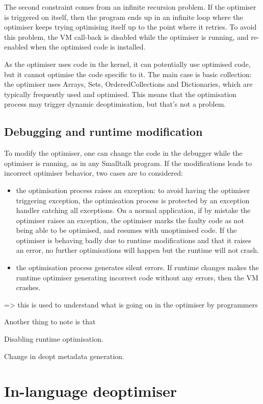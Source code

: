 \documentclass[a4paper,12pt,twoside]{../includes/ThesisStyle}
\begin{document}
The second constraint comes from an infinite recursion problem. If the optimiser is triggered on itself, then the program ends up in an infinite loop where the optimiser keeps trying optimising itself up to the point where it retries. To avoid this problem, the VM call-back is disabled while the optimiser is running, and re-enabled when the optimised code is installed.

As the optimiser uses code in the kernel, it can potentially use optimised code, but it cannot optimise the code specific to it. The main case is basic collection: the optimiser uses Arrays, Sets, OrderedCollections and Dictionaries, which are typically frequently used and optimised. This means that the optimisation process may trigger dynamic deoptimisation, but that's not a problem. 

\subsection{Debugging and runtime modification}

To modify the optimiser, one can change the code in the debugger while the optimiser is running, as in any Smalltalk program. If the modifications leads to incorrect optimiser behavior, two cases are to considered:
\begin{itemize}
	\item the optimisation process raises an exception: to avoid having the optimiser triggering exception, the optimisation process is protected by an exception handler catching all exceptions. On a normal application, if by mistake the optimiser raises an exception, the optimiser marks the faulty code as not being able to be optimised, and resumes with unoptimised code. If the optimiser is behaving badly due to runtime modifications and that it raises an error, no further optimisations will happen but the runtime will not crash.
	\item the optimisation process generates silent errors. If runtime changes makes the runtime optimiser generating incorrect code without any errors, then the VM crashes.
\end{itemize}

=> this is used to understand what is going on in the optimiser by programmers

Another thing to note is that

Disabling runtime optimisation.

Change in deopt metadata generation.

\section{In-language deoptimiser}
\end{document}
